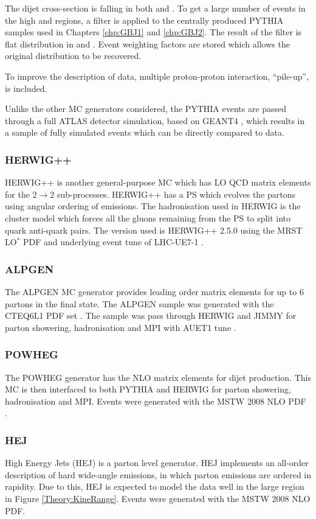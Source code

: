 The dijet cross-section is falling in both \ptb{} and \dy{}.
To get a large number of events in the high \ptb{} and \dy{} regions, a filter is applied to the centrally produced PYTHIA samples used in Chapters \ref{chp:GBJ1} and \ref{chp:GBJ2}. 
The result of the filter is flat distribution in \ptb{} and \dy{}. 
Event weighting factors are stored which allows the original distribution to be recovered. 

To improve the description of data, multiple proton-proton interaction, ``pile-up'', is included.

Unlike the other MC generators considered, the PYTHIA events are passed through a full ATLAS detector simulation, based on GEANT4 \cite{ref:Geant4}, which results in a sample of fully simulated events which can be directly compared to data. 

\subsubsection{HERWIG++}

HERWIG++\cite{ref:HERWIG} is another general-purpose MC which has LO QCD matrix elements for the $2 \rightarrow 2$ sub-processes.
HERWIG++ has a PS which evolves the partons using angular ordering of emissions.
The hadronisation used in HERWIG is the cluster model \cite{ref:ClusterModel} which forces all the gluons remaining from the PS to split into quark anti-quark pairs. 
The version used is HERWIG++ 2.5.0 \cite{ref:HERWIG} using the MRST LO$^*$ PDF and underlying event tune of LHC-UE7-1 \cite{ref:Herwigpp}. 
\subsubsection{ALPGEN}

The ALPGEN \cite{ref:ALPGEN} MC generator provides leading order matrix elements for up to 6 partons in the final state.
The ALPGEN sample was generated with the CTEQ6L1 PDF set \cite{ref:ALPGENPDF}.
The sample was pass through HERWIG and JIMMY \cite{ref:Jimmy} for parton showering, hadronisation and MPI with AUET1 tune \cite{ref:ALPGENTune}.

\subsubsection{POWHEG}
The POWHEG generator \cite{ref:Powheg1,ref:Powheg2,ref:Powheg3} has the NLO matrix elements for dijet production. 
This MC is then interfaced to both PYTHIA and HERWIG for parton showering, hadronisation and MPI.
Events were generated with the MSTW 2008 NLO PDF \cite{ref:MRST}.


\subsubsection{HEJ}
High Energy Jets (HEJ) \cite{ref:HEJ1,ref:HEJ2} is a parton level generator. 
HEJ implements an all-order description of hard wide-angle emissions, in which parton emissions are ordered in rapidity.
Due to this, HEJ is expected to model the data well in the large \dy{} region in Figure \ref{Theory:KineRange}.
Events were generated with the MSTW 2008 NLO PDF.


